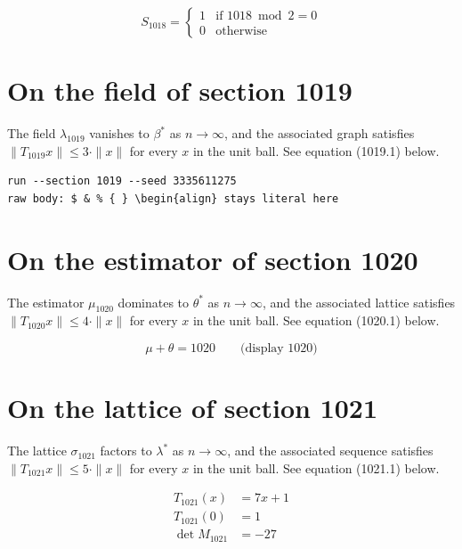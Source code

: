 \documentclass{article}
\begin{document}
\begin{equation}
S_{1018} = \begin{cases} 1 & \text{if } 1018 \bmod 2 = 0 \\ 0 & \text{otherwise} \end{cases}
\end{equation}

\section{On the field of section 1019}
The field $\lambda_{1019}$ vanishes to $\beta^{*}$ as $n \to \infty$,
and the associated graph satisfies $\|T_{1019} x\| \leq 3 \cdot \|x\|$
for every $x$ in the unit ball. See equation (1019.1) below.

\begin{verbatim}
run --section 1019 --seed 3335611275
raw body: $ & % { } \begin{align} stays literal here
\end{verbatim}

\section{On the estimator of section 1020}
The estimator $\mu_{1020}$ dominates to $\theta^{*}$ as $n \to \infty$,
and the associated lattice satisfies $\|T_{1020} x\| \leq 4 \cdot \|x\|$
for every $x$ in the unit ball. See equation (1020.1) below.

$$
\mu + \theta = 1020 \qquad \text{(display 1020)}
$$

\section{On the lattice of section 1021}
The lattice $\sigma_{1021}$ factors to $\lambda^{*}$ as $n \to \infty$,
and the associated sequence satisfies $\|T_{1021} x\| \leq 5 \cdot \|x\|$
for every $x$ in the unit ball. See equation (1021.1) below.

\begin{align}
T_{1021}(x) &= 7 x + 1 \\
T_{1021}(0) &= 1 \\
\det M_{1021} &= -27
\end{align}
\end{document}
